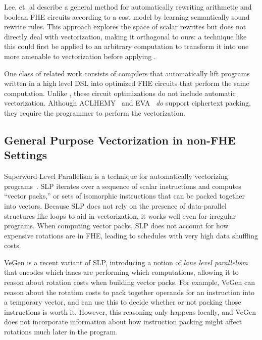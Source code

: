 Lee, et. al \cite{CircuitRewriting} describe a general method for automatically rewriting arithmetic and boolean FHE circuits according to a cost model by learning semantically sound rewrite rules.
This approach explores the space of scalar rewrites but does not directly deal with vectorization, making it orthogonal to ours: a technique like this could first be applied to an arbitrary computation to transform it into one more amenable to vectorization before applying \system.

One class of related work consists of compilers \cite{Ramparts, ALCHEMY, EVA, Cingulata} that automatically lift programs written in a high level DSL into optimized FHE circuits that perform the same computation.
Unlike \system, these circuit optimizations do not include automatic vectorization. Although ACLHEMY~\cite{ALCHEMY} and EVA~\cite{EVA} \textit{do} support ciphertext packing, they require the programmer to perform the vectorization.

\subsection{General Purpose Vectorization in non-FHE Settings}
Superword-Level Parallelism is a technique for automatically vectorizing programs~\cite{SLP}.
SLP iterates over a sequence of scalar instructions and computes ``vector packs,'' or sets of isomorphic instructions that can be packed together into vectors.
Because SLP does not rely on the presence of data-parallel structures like loops to aid in vectorization, it works well even for irregular programs.
When computing vector packs, SLP does not account for how expensive rotations are in FHE, leading to schedules with very high data shuffling costs. 

VeGen \cite{VeGen} is a recent variant of SLP, introducing a notion of {\em lane level parallelism} that encodes which lanes are performing which computations, allowing it to reason about rotation costs when building vector packs.
For example, VeGen can reason about the rotation costs to pack together operands for an instruction into a temporary vector, and can use this to decide whether or not packing those instructions is worth it.
However, this reasoning only happens locally, and VeGen does not incorporate information about how instruction packing might affect rotations much later in the program.

